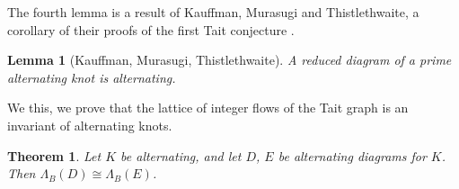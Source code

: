 \documentclass[12pt]{report}
\newtheorem*{theorem}{Theorem}
\newtheorem*{lemma}{Lemma}
\theoremstyle{upright}
\begin{document}
The fourth lemma is a result of Kauffman, Murasugi and Thistlethwaite, a corollary of their proofs of the first Tait conjecture \cite{state-models-jones-polynomial, jones-polynomials-classical-conjectures, spanning-tree-expansion-jones-polynomial}.

\begin{lemma}[Kauffman, Murasugi, Thistlethwaite]
	A reduced diagram of a prime alternating knot is alternating.
\end{lemma}

We this, we prove that the lattice of integer flows of the Tait graph is an invariant of alternating knots.

\begin{theorem}
	Let $K$ be alternating, and let $D$, $E$ be alternating diagrams for $K$. Then $\Lambda_{B}(D) \cong \Lambda_{B}(E)$.
\end{theorem}
\end{document}

